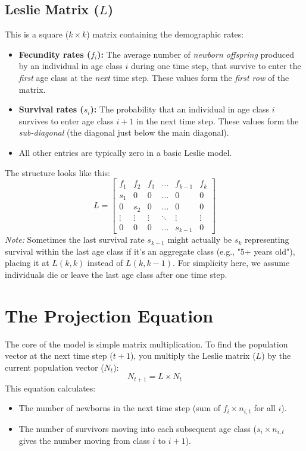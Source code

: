 \documentclass{article}
\begin{document}
\subsection{Leslie Matrix ($L$)}
This is a square ($k \times k$) matrix containing the demographic rates:
\begin{itemize}
    \item \textbf{Fecundity rates ($f_i$):} The average number of \emph{newborn offspring} produced by an individual in age class $i$ during one time step, that survive to enter the \emph{first} age class at the \emph{next} time step. These values form the \emph{first row} of the matrix.
    \item \textbf{Survival rates ($s_i$):} The probability that an individual in age class $i$ survives to enter age class $i+1$ in the next time step. These values form the \emph{sub-diagonal} (the diagonal just below the main diagonal).
    \item All other entries are typically zero in a basic Leslie model.
\end{itemize}

The structure looks like this:
\[
L = \begin{bmatrix}
f_1 & f_2 & f_3 & \dots & f_{k-1} & f_k \\
s_1 & 0 & 0 & \dots & 0 & 0 \\
0 & s_2 & 0 & \dots & 0 & 0 \\
\vdots & \vdots & \vdots & \ddots & \vdots & \vdots \\
0 & 0 & 0 & \dots & s_{k-1} & 0
\end{bmatrix}
\]
\emph{Note:} Sometimes the last survival rate $s_{k-1}$ might actually be $s_k$ representing survival within the last age class if it's an aggregate class (e.g., "5+ years old"), placing it at $L(k,k)$ instead of $L(k, k-1)$. For simplicity here, we assume individuals die or leave the last age class after one time step.

\section{The Projection Equation}

The core of the model is simple matrix multiplication. To find the population vector at the next time step ($t+1$), you multiply the Leslie matrix ($L$) by the current population vector ($N_t$):
\[
N_{t+1} = L \times N_t
\]
This equation calculates:
\begin{itemize}
    \item The number of newborns in the next time step (sum of $f_i \times n_{i,t}$ for all $i$).
    \item The number of survivors moving into each subsequent age class ($s_i \times n_{i,t}$ gives the number moving from class $i$ to $i+1$).
\end{itemize}
\end{document}
